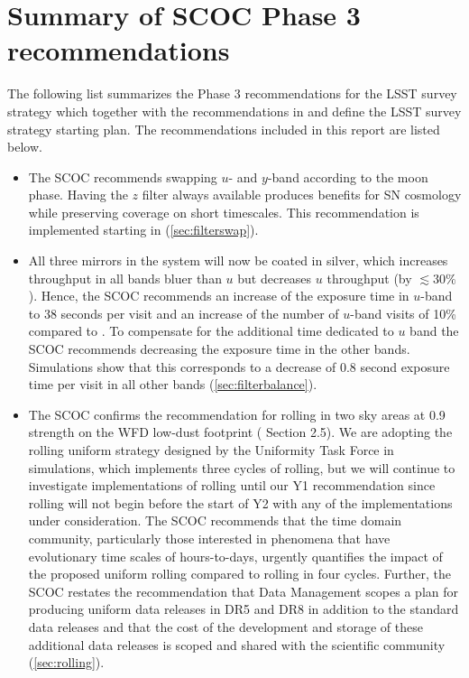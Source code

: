 \section{Summary of SCOC Phase 3 recommendations}\label{sec:summary}
The following list summarizes the Phase 3 recommendations for the LSST survey strategy which together with the recommendations in  and  define the LSST survey strategy starting plan.   The recommendations included in this report are listed below.

\begin{itemize}
\item The SCOC recommends swapping $u$- and $y$-band according to the moon phase. Having the $z$ filter always available  produces benefits for SN cosmology while preserving coverage on short timescales. This recommendation is implemented starting in  (\autoref{sec:filterswap}).




\item All three mirrors in the system will now be coated in silver, which increases throughput in all bands bluer than $u$ but decreases $u$ throughput (by $\lesssim30\%$). Hence, the SCOC recommends an increase of the exposure time in $u$-band to 38 seconds per visit and an increase of the number of $u$-band visits of 10\% compared to . To compensate for the additional time dedicated to $u$ band the SCOC recommends decreasing the exposure time in the other bands. Simulations show that this corresponds to a decrease of 0.8 second exposure time per visit in all other bands (\autoref{sec:filterbalance}).

\item {The SCOC confirms the recommendation for rolling in two sky areas at 0.9 strength on the WFD low-dust footprint ( Section 2.5). We are adopting the rolling uniform strategy designed by the Uniformity Task Force in  simulations, which implements three cycles of rolling, but we will continue to investigate implementations of rolling until our Y1 recommendation since rolling will not begin before the start of Y2 with any of the implementations under consideration.  The SCOC recommends that the time domain community, particularly those interested in phenomena that have evolutionary time scales of hours-to-days, urgently quantifies the impact of the proposed uniform rolling compared to rolling in four cycles. Further, the SCOC restates the recommendation that Data Management scopes a plan for producing uniform data releases in DR5 and DR8 in addition to the standard data releases and that the cost of the development and storage of these additional data releases is scoped and shared with the scientific community (\autoref{sec:rolling}).} 


\end{itemize}
